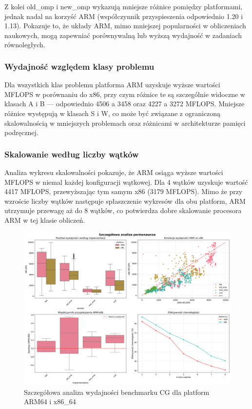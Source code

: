 Z kolei old\_omp i new\_omp wykazują mniejsze różnice pomiędzy platformami, jednak nadal na korzyść ARM (współczynnik przyspieszenia odpowiednio 1.20 i 1.13). Pokazuje to, że układy ARM, mimo mniejszej popularności w obliczeniach naukowych, mogą zapewniać porównywalną lub wyższą wydajność w zadaniach równoległych.
\subsubsection{Wydajność względem klasy problemu}
Dla wszystkich klas problemu platforma ARM uzyskuje wyższe wartości MFLOPS w porównaniu do x86, przy czym różnice te są szczególnie widoczne w klasach A i B — odpowiednio 4506 a 3458 oraz 4227 a 3272 MFLOPS. Mniejsze różnice występują w klasach S i W, co może być związane z ograniczoną skalowalnością w mniejszych problemach oraz różnicami w architekturze pamięci podręcznej.
\subsubsection{Skalowanie według liczby wątków}
Analiza wykresu skalowalności pokazuje, że ARM osiąga wyższe wartości MFLOPS w niemal każdej konfiguracji wątkowej. Dla 4 wątków uzyskuje wartość 4417 MFLOPS, przewyższając tym samym x86 (3179 MFLOPS). Mimo że przy wzroście liczby wątków następuje spłaszczenie wykresów dla obu platform, ARM utrzymuje przewagę aż do 8 wątków, co potwierdza dobre skalowanie procesora ARM w tej klasie obliczeń.

\begin{figure}[H]
    \centering
    \includegraphics[width=\textwidth]{analiza/images/parallel/cg/compare/cg_szczegolowa_analiza_wydajnosci.png}
    \caption{Szczegółowa analiza wydajności benchmarku CG dla platform ARM64 i x86\_64}
    \label{cg_szczegolowa_analiza_wydajnosci}
\end{figure}
